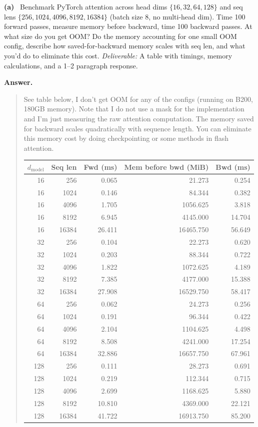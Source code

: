 \documentclass[11pt]{article}
\newcommand{\subq}[1]{\vspace{0.3em}\noindent\textbf{(#1)}\ }
\newcommand{\deliverable}[1]{\vspace{0.2em}\noindent\textit{Deliverable:} #1\par}
\newenvironment{answer}{%
  \vspace{0.3em}%
  \noindent\textbf{Answer.}\begin{quote}%
}{%
  \end{quote}\vspace{0.4em}%
}
\begin{document}
\subq{a} Benchmark PyTorch attention across head dims $\{16, 32, 64, 128\}$ and seq lens $\{256, 1024, 4096, 8192, 16384\}$ (batch size 8, no multi-head dim). Time 100 forward passes, measure memory before backward, time 100 backward passes. At what size do you get OOM? Do the memory accounting for one small OOM config, describe how saved-for-backward memory scales with seq len, and what you'd do to eliminate this cost.
\deliverable{A table with timings, memory calculations, and a 1--2 paragraph response.}
\begin{answer}
  See table below, I don't get OOM for any of the configs (running on B200, 180GB memory). 
  Note that I do not use a mask for the implementation and I'm just measuring the raw 
  attention computation. The memory saved for backward scales quadratically with sequence length.
  You can eliminate this memory cost by doing checkpointing or some methods in flash attention.
  \centering
  \begin{tabular}{rrrrr}
    \toprule
    $d_{\text{model}}$ & Seq len & Fwd (ms) & Mem before bwd (MiB) & Bwd (ms) \\
    \midrule
    16  & 256   & 0.065  & 21.273    & 0.254  \\
    16  & 1024  & 0.146  & 84.344    & 0.382  \\
    16  & 4096  & 1.705  & 1056.625  & 3.818  \\
    16  & 8192  & 6.945  & 4145.000  & 14.704 \\
    16  & 16384 & 26.411 & 16465.750 & 56.649 \\
    32  & 256   & 0.104  & 22.273    & 0.620  \\
    32  & 1024  & 0.203  & 88.344    & 0.722  \\
    32  & 4096  & 1.822  & 1072.625  & 4.189  \\
    32  & 8192  & 7.385  & 4177.000  & 15.388 \\
    32  & 16384 & 27.908 & 16529.750 & 58.417 \\
    64  & 256   & 0.062  & 24.273    & 0.256  \\
    64  & 1024  & 0.191  & 96.344    & 0.422  \\
    64  & 4096  & 2.104  & 1104.625  & 4.498  \\
    64  & 8192  & 8.508  & 4241.000  & 17.254 \\
    64  & 16384 & 32.886 & 16657.750 & 67.961 \\
    128 & 256   & 0.111  & 28.273    & 0.691  \\
    128 & 1024  & 0.219  & 112.344   & 0.715  \\
    128 & 4096  & 2.699  & 1168.625  & 5.880  \\
    128 & 8192  & 10.810 & 4369.000  & 22.121 \\
    128 & 16384 & 41.722 & 16913.750 & 85.200 \\
    \bottomrule
  \end{tabular}
\end{answer}
\end{document}
